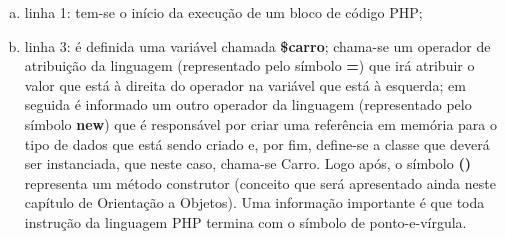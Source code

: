 \begin{enumerate}[a)]
    \item linha 1: tem-se o início da execução de um bloco de código PHP;
    \item linha 3: é definida uma variável chamada \textbf{\$carro};
    chama-se um operador de atribuição da linguagem (representado pelo símbolo
    \textbf{=}) que irá atribuir o valor que está à direita do operador na
    variável que está à esquerda; em seguida é informado um outro operador da
    linguagem (representado pelo símbolo \textbf{new}) que é responsável por
    criar uma referência em memória para o tipo de dados que está sendo
    criado e, por fim, define-se a classe que deverá ser instanciada, que neste
    caso, chama-se Carro. Logo após, o símbolo \textbf{()} representa um método
    construtor (conceito que será apresentado ainda neste capítulo de Orientação
    a Objetos).
    Uma informação importante é que toda instrução da linguagem \acs{PHP} termina
    com o símbolo de ponto-e-vírgula.
\end{enumerate}
